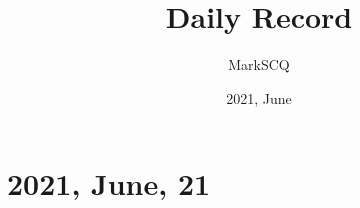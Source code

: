\documentclass[UTF8]{article}
\title{Daily Record}
\author{MarkSCQ}
\date{2021, June}
\begin{document}
\maketitle
  
\tableofcontents


\section{2021, June, 21}
\end{document}
